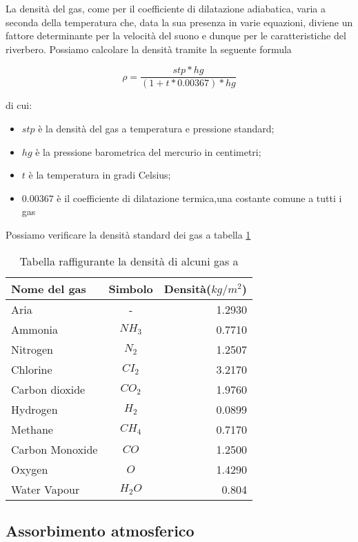 La densità del gas, come per il coefficiente di dilatazione adiabatica, varia a
seconda della temperatura che, data la sua presenza in varie equazioni, diviene
un fattore determinante per la velocità del suono e dunque per le
caratteristiche del riverbero. Possiamo calcolare la densità tramite la seguente
formula%

\begin{equation}
\rho = \frac{stp*hg}{(1+t*0.00367)*hg}
\end{equation}

di cui:

\begin{itemize}
  \item $stp$ è la densità del gas a temperatura e pressione standard;
  \item $hg$ è la pressione barometrica del mercurio in centimetri;
  \item $t$ è la temperatura in gradi Celsius;
  \item $0.00367$ è il coefficiente di dilatazione termica,una costante comune
        a tutti i gas
\end{itemize}

Possiamo verificare la densità standard dei gas a tabella \ref{tab:dens}

\bigskip
\begin{table}[h]
\centering
\caption{Tabella raffigurante la densità di alcuni gas a \emph{}}
\label{tab:dens}
\begin{tabular}{lcr}
\toprule
Nome del gas & Simbolo & Densità($kg/m^2$) \\
\midrule
Aria & - & 1.2930 \\
Ammonia & $NH_3$ & 0.7710 \\
Nitrogen & $N_2$ & 1.2507 \\
Chlorine & $CI_2$ & 3.2170 \\
Carbon dioxide & $CO_2$ & 1.9760 \\
Hydrogen & $H_2$ & 0.0899 \\
Methane & $CH_4$ & 0.7170 \\
Carbon Monoxide & $CO$ & 1.2500 \\
Oxygen & $O$ &1.4290 \\
Water Vapour & $H_2O$ & 0.804 \\
\bottomrule
\end{tabular}
\end{table}
\smallskip

\subsection{Assorbimento atmosferico}


